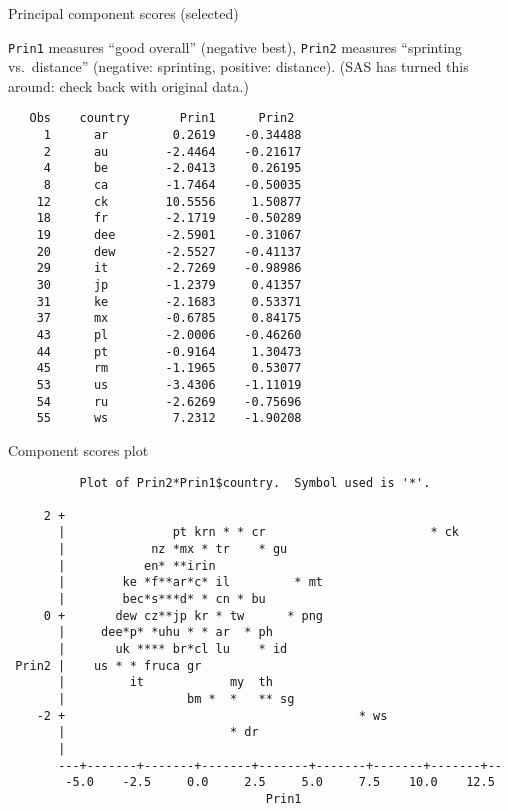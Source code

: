 \documentclass[pdf]{prosper}
\begin{document}
\begin{slide}{Principal component scores (selected)}

\verb-Prin1- measures ``good overall'' (negative best), \verb-Prin2- measures ``sprinting vs.\ distance'' (negative: sprinting, positive: distance). (SAS has turned this around: check back with original data.) 
{\tiny
\begin{verbatim}
   Obs    country       Prin1      Prin2
     1      ar         0.2619    -0.34488
     2      au        -2.4464    -0.21617
     4      be        -2.0413     0.26195
     8      ca        -1.7464    -0.50035
    12      ck        10.5556     1.50877
    18      fr        -2.1719    -0.50289
    19      dee       -2.5901    -0.31067
    20      dew       -2.5527    -0.41137
    29      it        -2.7269    -0.98986
    30      jp        -1.2379     0.41357
    31      ke        -2.1683     0.53371
    37      mx        -0.6785     0.84175
    43      pl        -2.0006    -0.46260
    44      pt        -0.9164     1.30473
    45      rm        -1.1965     0.53077
    53      us        -3.4306    -1.11019
    54      ru        -2.6269    -0.75696
    55      ws         7.2312    -1.90208

\end{verbatim}
}
  
\end{slide}

\begin{slide}{Component scores plot}

{\scriptsize
\begin{verbatim}
          Plot of Prin2*Prin1$country.  Symbol used is '*'.

     2 +
       |               pt krn * * cr                       * ck
       |            nz *mx * tr    * gu
       |           en* **irin
       |        ke *f**ar*c* il         * mt
       |        bec*s***d* * cn * bu
     0 +       dew cz**jp kr * tw      * png
       |     dee*p* *uhu * * ar  * ph
       |       uk **** br*cl lu    * id
 Prin2 |    us * * fruca gr
       |         it            my  th
       |                 bm *  *   ** sg
    -2 +                                         * ws
       |                       * dr
       |
       ---+-------+-------+-------+-------+-------+-------+-------+--
        -5.0    -2.5     0.0     2.5     5.0     7.5    10.0    12.5
                                    Prin1
\end{verbatim}
}
  
\end{slide}
\end{document}
